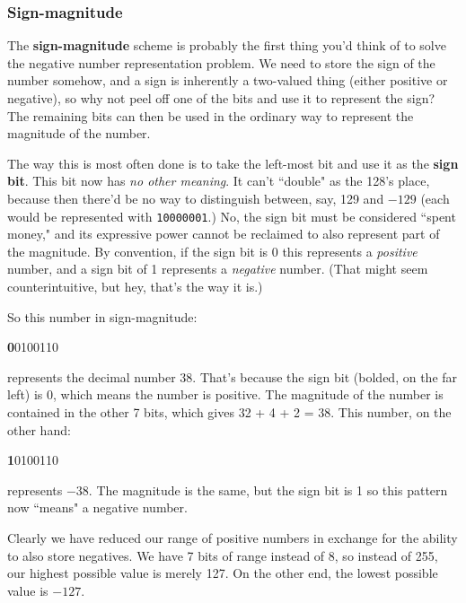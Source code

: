 \subsubsection{Sign-magnitude}

The \textbf{sign-magnitude} scheme is probably the first thing you'd think
of to solve the negative number representation problem. We need to store
the sign of the number somehow, and a sign is inherently a two-valued thing
(either positive or negative), so why not peel off one of the bits and use
it to represent the sign? The remaining bits can then be used in the
ordinary way to represent the magnitude of the number.

The way this is most often done is to take the left-most bit and use it as
the \textbf{sign bit}. This bit now has \textit{no other meaning}. It can't
``double" as the 128's place, because then there'd be no way to distinguish
between, say, 129 and $-129$ (each would be represented with
\texttt{10000001}.) No, the sign bit must be considered ``spent money," and
its expressive power cannot be reclaimed to also represent part of the
magnitude. By convention, if the sign bit is 0 this represents a
\textit{positive} number, and a sign bit of 1 represents a
\textit{negative} number. (That might seem counterintuitive, but hey,
that's the way it is.)

So this number in sign-magnitude:
\begin{center}
{\large
\textbf{0}0100110
}
\end{center}
represents the decimal number 38. That's because the sign bit (bolded, on
the far left) is 0, which means the number is positive. The magnitude of
the number is contained in the other 7 bits, which gives 32 + 4 + 2 = 38.
This number, on the other hand:
\begin{center}
{\large
\textbf{1}0100110
}
\end{center}
represents $-38$. The magnitude is the same, but the sign bit is 1 so this
pattern now ``means" a negative number.

Clearly we have reduced our range of positive numbers in exchange for the
ability to also store negatives. We have 7 bits of range instead of 8, so
instead of 255, our highest possible value is merely 127. On the other end,
the lowest possible value is $-127$. 

